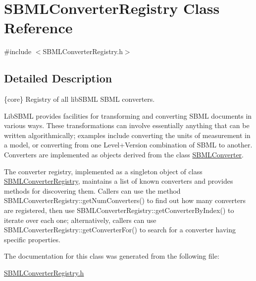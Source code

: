 \hypertarget{class_s_b_m_l_converter_registry}{}\section{S\+B\+M\+L\+Converter\+Registry Class Reference}
\label{class_s_b_m_l_converter_registry}


{\ttfamily \#include $<$S\+B\+M\+L\+Converter\+Registry.\+h$>$}



\subsection{Detailed Description}
\{core\} Registry of all lib\+S\+B\+ML S\+B\+ML converters.



Lib\+S\+B\+ML provides facilities for transforming and converting S\+B\+ML documents in various ways. These transformations can involve essentially anything that can be written algorithmically; examples include converting the units of measurement in a model, or converting from one Level+\+Version combination of S\+B\+ML to another. Converters are implemented as objects derived from the class \hyperlink{class_s_b_m_l_converter}{S\+B\+M\+L\+Converter}.

The converter registry, implemented as a singleton object of class \hyperlink{class_s_b_m_l_converter_registry}{S\+B\+M\+L\+Converter\+Registry}, maintains a list of known converters and provides methods for discovering them. Callers can use the method S\+B\+M\+L\+Converter\+Registry\+::get\+Num\+Converters() to find out how many converters are registered, then use S\+B\+M\+L\+Converter\+Registry\+::get\+Converter\+By\+Index() to iterate over each one; alternatively, callers can use S\+B\+M\+L\+Converter\+Registry\+::get\+Converter\+For() to search for a converter having specific properties. 

The documentation for this class was generated from the following file\+:\begin{DoxyCompactItemize}
\item 
\hyperlink{_s_b_m_l_converter_registry_8h}{S\+B\+M\+L\+Converter\+Registry.\+h}\end{DoxyCompactItemize}
